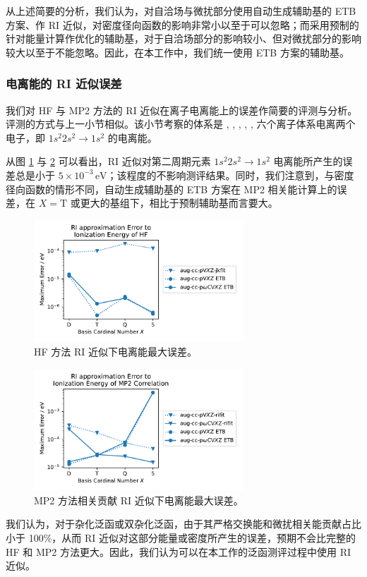 从上述简要的分析，我们认为，对自洽场与微扰部分使用自动生成辅助基的 ETB 方案、作 RI 近似，对密度径向函数的影响非常小以至于可以忽略；而采用预制的针对能量计算作优化的辅助基，对于自洽场部分的影响较小、但对微扰部分的影响较大以至于不能忽略。因此，在本工作中，我们统一使用 ETB 方案的辅助基。

\subsubsection{电离能的 RI 近似误差}

我们对 HF 与 MP2 方法的 RI 近似在离子电离能上的误差作简要的评测与分析。评测的方式与上一小节相似。该小节考察的体系是 , , , , ,  六个离子体系电离两个电子，即 $1s^2 2s^2 \rightarrow 1s^2$ 的电离能。

从图 \ref{fig.HF-RI-eng} 与 \ref{fig.MP2-RI-eng} 可以看出，RI 近似对第二周期元素 $1s^2 2s^2 \rightarrow 1s^2$ 电离能所产生的误差总是小于 $5 \times 10^{-3} \, \text{eV}$；该程度的不影响测评结果。同时，我们注意到，与密度径向函数的情形不同，自动生成辅助基的 ETB 方案在 MP2 相关能计算上的误差，在 $X=\mathrm{T}$ 或更大的基组下，相比于预制辅助基而言要大。

\begin{figure}[h]
    \centering
    \caption{HF 方法 RI 近似下电离能最大误差。}
    \label{fig.HF-RI-eng}
    \includegraphics[width=0.7\textwidth]{assets/HF-RI-eng.pdf}
\end{figure}

\begin{figure}[h]
    \centering
    \caption{MP2 方法相关贡献 RI 近似下电离能最大误差。}
    \label{fig.MP2-RI-eng}
    \includegraphics[width=0.7\textwidth]{assets/MP2-RI-eng.pdf}
\end{figure}

我们认为，对于杂化泛函或双杂化泛函，由于其严格交换能和微扰相关能贡献占比小于 100\%，从而 RI 近似对这部分能量或密度所产生的误差，预期不会比完整的 HF 和 MP2 方法更大。因此，我们认为可以在本工作的泛函测评过程中使用 RI 近似。

\newpage






